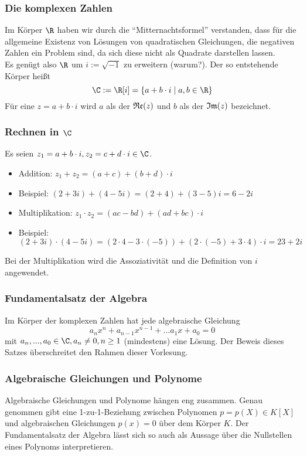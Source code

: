 %
\begin{frame}\frametitle{Die komplexen Zahlen}
Im Körper $\R$ haben wir durch die ``Mitternachtsformel'' verstanden, dass für die allgemeine Existenz von Lösungen von quadratischen Gleichungen, die negativen Zahlen ein Problem sind, da sich diese nicht als Quadrate darstellen lassen. \\\pause
Es genügt also $\R$ um $i:=\sqrt{-1}$ zu erweitern (warum?). Der so entstehende Körper heißt 
$$
\C:=\R[i]=\{a+b\cdot i \mid a,b \in \R\}
$$ \pause
Für eine  $z=a+b \cdot i$ wird $a$ als der  $\frak{Re}(z)$ und $b$ als der  $\frak{Im}(z)$ bezeichnet.
\end{frame}
%
\begin{frame}\frametitle{Rechnen in $\C$}
Es seien $z_1=a+b\cdot i, z_2=c+d\cdot i \in \C$.
\vfill
\begin{itemize}
\item Addition: $z_1 + z_2 = (a+c)+(b+d)\cdot i$ \pause
\item[] Beispiel: $(2+3i)+(4-5i)=(2+4)+(3-5)i=6-2i$\pause
\vfill
\item Multiplikation: $z_1\cdot z_2=(ac-bd)+(ad+bc)\cdot i$ \pause
\item[] Beispiel: $(2+3i)\cdot(4-5i)=(2\cdot 4 - 3\cdot (-5))+(2\cdot (-5)+ 3\cdot 4)\cdot i=23+2i$
\end{itemize}
\vfill
Bei der Multiplikation wird die Assoziativität und die Definition von $i$ angewendet.
\end{frame}
%
\begin{frame}\frametitle{Fundamentalsatz der Algebra}
Im Körper der komplexen Zahlen hat jede algebraische Gleichung 
$$
a_nx^n +a_{n-1}x^{n-1} + ... a_1x+a_0 =0 
$$
mit $a_n,...,a_0 \in \C, a_n \ne 0, n\ge 1$ (mindestens) eine Lösung.
\vfill
Der Beweis dieses Satzes überschreitet den Rahmen dieser Vorlesung.
\end{frame}
%
\begin{frame}\frametitle{Algebraische Gleichungen und Polynome}
Algebraische Gleichungen und Polynome hängen eng zusammen. Genau genommen gibt eine 1-zu-1-Beziehung zwischen Polynomen $p=p(X) \in K[X]$ und algebraischen Gleichungen $p(x)=0$ über dem Körper $K$.
\vfill
Der Fundamentalsatz der Algebra lässt sich so auch als Aussage über die Nullstellen eines Polynoms interpretieren.
\end{frame}
%
%

